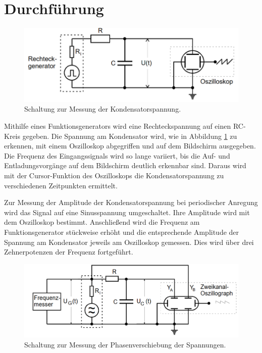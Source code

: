 \section{Durchführung}
\label{sec:Durchführung}

\begin{figure}[H]
  \centering
  \includegraphics[width=14cm]{Schaltung1.PNG}
  \caption{Schaltung zur Messung der Kondensatorspannung. \cite{sample}}
  \label{fig:Schaltung1}
\end{figure}

Mithilfe eines Funktionsgenerators wird eine Rechteckspannung auf einen RC-Kreis
gegeben. Die Spannung am Kondensator wird, wie in Abbildung \ref{fig:Schaltung1}
zu erkennen, mit einem Oszilloskop abgegriffen und
auf dem Bildschirm ausgegeben. Die Frequenz des Eingangssignals wird so lange variiert,
bis die Auf- und Entladungsvorgänge auf dem Bildschirm deutlich erkennbar sind.
Daraus wird mit der Cursor-Funktion des Oszilloskops die Kondensatorspannung zu verschiedenen Zeitpunkten ermittelt.

Zur Messung der Amplitude der Kondensatorspannung bei periodischer Anregung
wird das Signal auf eine Sinusspannung umgeschaltet. Ihre Amplitude wird mit dem Oszilloskop bestimmt.
Anschließend wird die Frequenz am Funktionsgenerator stückweise erhöht und die entsprechende Amplitude
der Spannung am Kondensator jeweils am Oszilloskop gemessen. Dies wird über drei Zehnerpotenzen der Frequenz
fortgeführt.

\begin{figure}[H]
  \centering
  \includegraphics[width=14cm]{Schaltung2.PNG}
  \caption{Schaltung zur Messung der Phasenverschiebung der Spannungen. \cite{sample}}
  \label{fig:Schaltung2}
\end{figure}

